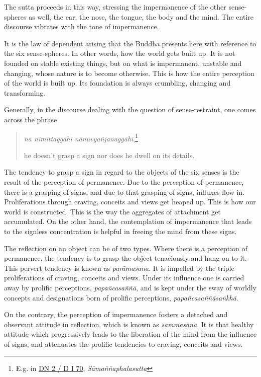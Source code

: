 The sutta proceeds in this way, stressing the impermanence of the other sense-spheres as well, the ear, the nose, the tongue, the body and the mind. The entire discourse vibrates with the tone of impermanence.

It is the law of dependent arising that the Buddha presents here with reference to the six sense-spheres. In other words, how the world gets built up. It is not founded on stable existing things, but on what is impermanent, unstable and changing, whose nature is to become otherwise. This is how the entire perception of the world is built up. Its foundation is always crumbling, changing and transforming.

Generally, in the discourse dealing with the question of sense-restraint, one comes across the phrase

\begin{quote}
\emph{na nimittaggāhi nānuvyañjanaggāhī},\footnote{E.g. in \href{https://suttacentral.net/dn2/pli/ms}{DN 2 / D I 70}, \emph{Sāmaññaphalasutta}}

he doesn't grasp a sign nor does he dwell on its details.
\end{quote}

The tendency to grasp a sign in regard to the objects of the six senses is the result of the perception of permanence. Due to the perception of permanence, there is a grasping of signs, and due to that grasping of signs, influxes flow in. Proliferations through craving, conceits and views get heaped up. This is how our world is constructed. This is the way the aggregates of attachment get accumulated. On the other hand, the contemplation of impermanence that leads to the signless concentration is helpful in freeing the mind from these signs.

The reflection on an object can be of two types. Where there is a perception of permanence, the tendency is to grasp the object tenaciously and hang on to it. This pervert tendency is known as \emph{parāmasana}. It is impelled by the triple proliferations of craving, conceits and views. Under its influence one is carried away by prolific perceptions, \emph{papañcasaññā}, and is kept under the sway of worldly concepts and designations born of prolific perceptions, \emph{papañcasaññāsaṅkhā}.

On the contrary, the perception of impermanence fosters a detached and observant attitude in reflection, which is known as \emph{sammasana}. It is that healthy attitude which progressively leads to the liberation of the mind from the influence of signs, and attenuates the prolific tendencies to craving, conceits and views.

